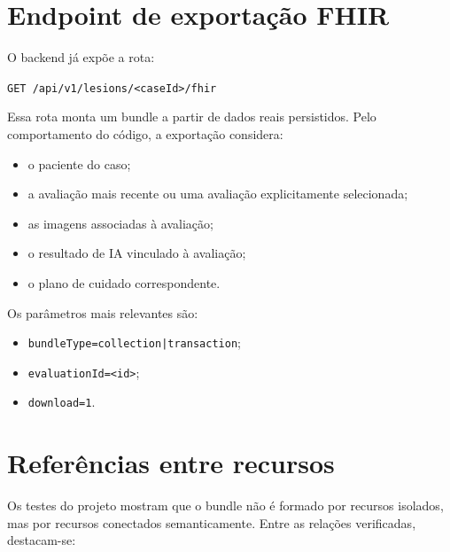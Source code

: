 \documentclass[
    12pt,
    openright,
    oneside,
    a4paper,
    chapter=TITLE,
    section=TITLE,
    brazil,
    sumario=tradicional,
    hidelinks
]{abntex2}
\begin{document}
\section{Endpoint de exporta\c{c}\~ao FHIR}

O backend j\'a exp\~oe a rota:

\begin{center}
\texttt{GET /api/v1/lesions/<caseId>/fhir}
\end{center}

Essa rota monta um bundle a partir de dados reais persistidos. Pelo comportamento do c\'odigo, a exporta\c{c}\~ao considera:

\begin{itemize}
    \item o paciente do caso;
    \item a avalia\c{c}\~ao mais recente ou uma avalia\c{c}\~ao explicitamente selecionada;
    \item as imagens associadas \`a avalia\c{c}\~ao;
    \item o resultado de IA vinculado \`a avalia\c{c}\~ao;
    \item o plano de cuidado correspondente.
\end{itemize}

Os par\^ametros mais relevantes s\~ao:

\begin{itemize}
    \item \texttt{bundleType=collection|transaction};
    \item \texttt{evaluationId=<id>};
    \item \texttt{download=1}.
\end{itemize}

\section{Refer\^encias entre recursos}

Os testes do projeto mostram que o bundle n\~ao \'e formado por recursos isolados, mas por recursos conectados semanticamente. Entre as rela\c{c}\~oes verificadas, destacam-se:
\end{document}
